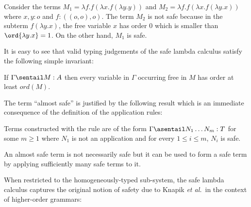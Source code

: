 \begin{example}
\label{ex:kierstead}
Consider the terms $M_1 = \lambda f . f (\lambda x . f (\lambda y . y
))$ and $M_2 = \lambda f . f (\lambda x . f (\lambda y .x ))$ where
$x,y:o$ and $f:((o,o),o)$. The term $M_2$ is not safe because in the
subterm $f (\lambda y . x)$, the free variable $x$ has order $0$ which
is smaller than $\ord{\lambda y . x} = 1$.  On the other hand, $M_1$
is safe.
\end{example}

It is easy to see that valid typing judgements of the safe lambda
calculus satisfy the following simple invariant:
\begin{lemma}
\label{lem:ordfreevar}
If $\Gamma \sentail M : A$ then every variable in $\Gamma$ occurring
free in $M$ has order at least $ord(M)$.
\end{lemma}

The term ``almost safe'' is justified by the following result which is an immediate consequence of the definition of the application rules:
\begin{lemma}
\label{lem:almostsafe_is_appplicative_safe} Terms constructed with the
rule  are of the form $\Gamma \asentail N_1
\ldots N_m : T$ for some $m\geq 1$ where $N_1$ is not an application and
for every $1 \leq i\leq m$, $N_i$ is safe.
\end{lemma}
An almost safe term is not necessarily safe but it can be used to form a safe term by applying sufficiently many safe terms to it.
\bigskip

When restricted to the homogeneously-typed sub-system, the safe
lambda calculus captures the original notion of safety due to Knapik
\emph{et al.}~in the context of higher-order grammars:

